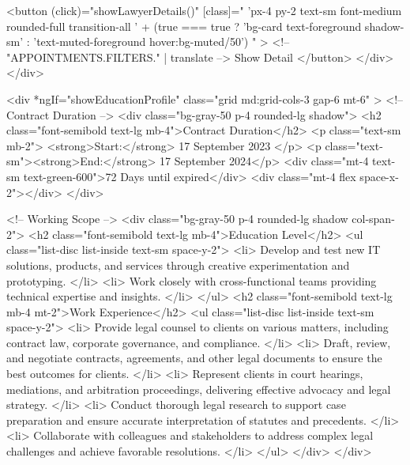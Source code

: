             <button
              (click)="showLawyerDetails()"
              [class]="
                'px-4 py-2 text-sm font-medium rounded-full transition-all ' +
                (true === true
                  ? 'bg-card text-foreground shadow-sm'
                  : 'text-muted-foreground hover:bg-muted/50')
              "
            >
              <!-- {{ "APPOINTMENTS.FILTERS." | translate }} -->
              Show Detail
            </button>
          </div>
        </div>

        <div
          *ngIf="showEducationProfile"
          class="grid md:grid-cols-3 gap-6 mt-6"
        >
          <!-- Contract Duration -->
          <div class="bg-gray-50 p-4 rounded-lg shadow">
            <h2 class="font-semibold text-lg mb-4">Contract Duration</h2>
            <p class="text-sm mb-2">
              <strong>Start:</strong> 17 September 2023
            </p>
            <p class="text-sm"><strong>End:</strong> 17 September 2024</p>
            <div class="mt-4 text-sm text-green-600">72 Days until expired</div>
            <div class="mt-4 flex space-x-2"></div>
          </div>

          <!-- Working Scope -->
          <div class="bg-gray-50 p-4 rounded-lg shadow col-span-2">
            <h2 class="font-semibold text-lg mb-4">Education Level</h2>
            <ul class="list-disc list-inside text-sm space-y-2">
              <li>
                Develop and test new IT solutions, products, and services
                through creative experimentation and prototyping.
              </li>
              <li>
                Work closely with cross-functional teams providing technical
                expertise and insights.
              </li>
            </ul>
            <h2 class="font-semibold text-lg mb-4 mt-2">Work Experience</h2>
            <ul class="list-disc list-inside text-sm space-y-2">
              <li>
                Provide legal counsel to clients on various matters, including
                contract law, corporate governance, and compliance.
              </li>
              <li>
                Draft, review, and negotiate contracts, agreements, and other
                legal documents to ensure the best outcomes for clients.
              </li>
              <li>
                Represent clients in court hearings, mediations, and arbitration
                proceedings, delivering effective advocacy and legal strategy.
              </li>
              <li>
                Conduct thorough legal research to support case preparation and
                ensure accurate interpretation of statutes and precedents.
              </li>
              <li>
                Collaborate with colleagues and stakeholders to address complex
                legal challenges and achieve favorable resolutions.
              </li>
            </ul>
          </div>
        </div>

